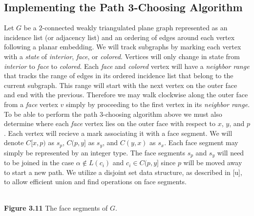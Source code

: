\documentclass[11pt,letter]{article}
\begin{document}
\subsection*{Implementing the Path 3-Choosing Algorithm}

Let $G$ be a $2$-connected weakly triangulated plane graph represented as an incidence list (or adjacency list)
and an ordering of edges around each vertex following a planar embedding.
We will track subgraphs by marking each vertex with a \emph{state} of \emph{interior},
\emph{face}, or \emph{colored}. Vertices will only change in state from \emph{interior} to \emph{face} to
\emph{colored}. Each \emph{face} and \emph{colored} vertex will have a \emph{neighbor range}
that tracks the range of edges in its ordered incidence list that belong to the current subgraph. This range
will start with the next vertex on the outer face and end with the previous.
Therefore we may walk clockwise along the outer face from a
\emph{face} vertex $v$ simply by proceeding to the first vertex in its \emph{neighbor range}.\\

\noindent To be able to perform the path $3$-choosing algorithm above we must also determine where each
\emph{face} vertex lies on the outer face with respect to $x$, $y$, and $p$. Each vertex will recieve a mark
associating it with a face segment. We will denote $C[x,p)$ as $s_p$, $C(p,y]$ as $s_y$, and $C(y,x)$ as $s_x$.
Each face segment may simply be represented by an integer type. The face
segments $s_p$ and $s_y$ will need to be joined in the case $\alpha\not\in L(c_i)$
and $c_i\in C(p,y]$ since $p$ will be moved away to start a new path. We utilize a disjoint set data structure,
as described in [u], to allow efficient union and find operations on face segments.

\begin{center}
\hfill\\
\textbf{Figure 3.11} The face segments of $G$.
\end{center}
\end{document}
